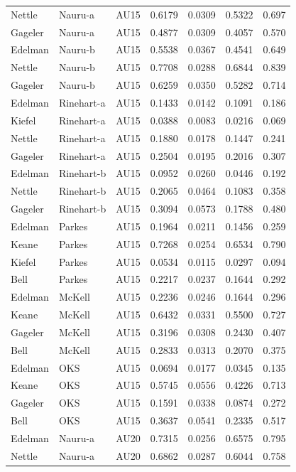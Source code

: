 \documentclass{monashthesis}
\begin{document}
\begin{center}
\begin{longtable}{lllllll}
Nettle & Nauru-a & AU15 & 0.6179 & 0.0309 & 0.5322 & 0.697 \\
Gageler & Nauru-a & AU15 & 0.4877 & 0.0309 & 0.4057 & 0.570 \\
Edelman & Nauru-b & AU15 & 0.5538 & 0.0367 & 0.4541 & 0.649 \\
Nettle & Nauru-b & AU15 & 0.7708 & 0.0288 & 0.6844 & 0.839 \\
Gageler & Nauru-b & AU15 & 0.6259 & 0.0350 & 0.5282 & 0.714 \\
Edelman & Rinehart-a & AU15 & 0.1433 & 0.0142 & 0.1091 & 0.186 \\
Kiefel & Rinehart-a & AU15 & 0.0388 & 0.0083 & 0.0216 & 0.069 \\
Nettle & Rinehart-a & AU15 & 0.1880 & 0.0178 & 0.1447 & 0.241 \\
Gageler & Rinehart-a & AU15 & 0.2504 & 0.0195 & 0.2016 & 0.307 \\
Edelman & Rinehart-b & AU15 & 0.0952 & 0.0260 & 0.0446 & 0.192 \\
Nettle & Rinehart-b & AU15 & 0.2065 & 0.0464 & 0.1083 & 0.358 \\
Gageler & Rinehart-b & AU15 & 0.3094 & 0.0573 & 0.1788 & 0.480 \\
Edelman & Parkes & AU15 & 0.1964 & 0.0211 & 0.1456 & 0.259 \\
Keane & Parkes & AU15 & 0.7268 & 0.0254 & 0.6534 & 0.790 \\
Kiefel & Parkes & AU15 & 0.0534 & 0.0115 & 0.0297 & 0.094 \\
Bell & Parkes & AU15 & 0.2217 & 0.0237 & 0.1644 & 0.292 \\
Edelman & McKell & AU15 & 0.2236 & 0.0246 & 0.1644 & 0.296 \\
Keane & McKell & AU15 & 0.6432 & 0.0331 & 0.5500 & 0.727 \\
Gageler & McKell & AU15 & 0.3196 & 0.0308 & 0.2430 & 0.407 \\
Bell & McKell & AU15 & 0.2833 & 0.0313 & 0.2070 & 0.375 \\
Edelman & OKS & AU15 & 0.0694 & 0.0177 & 0.0345 & 0.135 \\
Keane & OKS & AU15 & 0.5745 & 0.0556 & 0.4226 & 0.713 \\
Gageler & OKS & AU15 & 0.1591 & 0.0338 & 0.0874 & 0.272 \\
Bell & OKS & AU15 & 0.3637 & 0.0541 & 0.2335 & 0.517 \\
Edelman & Nauru-a & AU20 & 0.7315 & 0.0256 & 0.6575 & 0.795 \\
Nettle & Nauru-a & AU20 & 0.6862 & 0.0287 & 0.6044 & 0.758 \\

\end{longtable}
\end{center}
\end{document}
